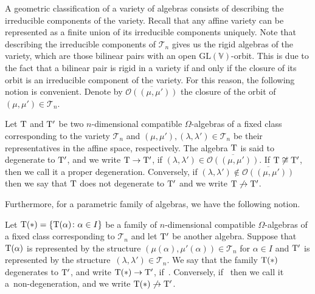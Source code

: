 \documentclass[10pt,a4paper]{amsart}
\numberwithin{equation}{section}
\begin{document}
A geometric classification of a variety of algebras consists of describing the irreducible components of the variety. Recall that any affine variety can be represented as a finite union of its irreducible components uniquely.
Note that describing the irreducible components of ${\mathcal{T}_{n}}$ gives us the rigid
algebras of the variety, which are those bilinear pairs with an open $\textrm{GL}(\mathbb V)$-orbit. This %
is due to the fact that a bilinear pair is rigid in a variety if and only if the closure of its orbit is an irreducible component of the variety. %
For this reason, the following notion is convenient. Denote by $\overline{{\mathcal O}((\mu, \mu'))}$ the closure of the orbit of $(\mu, \mu')\in{\mathcal{T}_{n}}$.

\begin{Definition}
Let ${\rm T} $ and ${\rm T}'$ be two $n$-dimensional compatible $\Omega$-algebras of a fixed class corresponding to the variety $\mathcal{T}_{n}$ and $(\mu, \mu'), (\lambda,\lambda') \in \mathcal{T}_{n}$ be their representatives in the affine space, respectively. The algebra ${\rm T}$ is said to {degenerate} to ${\rm T}'$, and we write ${\rm T} \to {\rm T} '$, if $(\lambda,\lambda')\in\overline{{\mathcal O}((\mu, \mu'))}$. If ${\rm T} \not\cong {\rm T}'$, then we call it a {proper degeneration}.
Conversely, if $(\lambda,\lambda')\not\in\overline{{\mathcal O}((\mu, \mu'))}$ then we say that ${{\rm T} }$ does not degenerate to ${{\rm T} }'$
and we write ${{\rm T} }\not\to {{\rm T} }'$.
\end{Definition}

Furthermore, for a parametric family of algebras, we have the following notion.

\begin{Definition}
Let ${{\rm T} }(*)=\{{{\rm T} }(\alpha)\colon {\alpha\in I}\}$ be a family of $n$-dimensional compatible $\Omega$-algebras of a fixed class corresponding to ${\mathcal{T} }_n$ and let ${{\rm T} }'$ be another algebra. Suppose that ${{\rm T} }(\alpha)$ is represented by the structure $(\mu(\alpha),\mu'(\alpha))\in{\mathcal{T} }_n$ for $\alpha\in I$ and ${{\rm T} }'$ is represented by the structure~${(\lambda, \lambda')\in{\mathcal{T} }_n}$. We say that the family ${{\rm T} }(*)$ {degenerates} to ${{\rm T} }'$, and write ${{\rm T} }(*)\to {{\rm T} }'$, if~.
Conversely, if~ then we call it a~{non-degeneration}, and we write ${{\rm T} }(*)\not\to {{\rm T} }'$.
\end{Definition}
\end{document}

